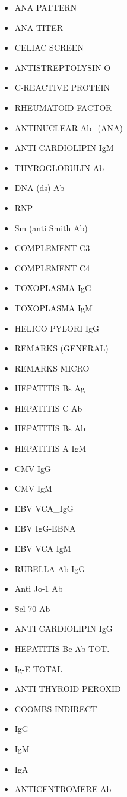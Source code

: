 \documentclass[a4paper,12pt]{article}
\begin{document}
\begin{appendices}
\begin{itemize}
   			\item ANA PATTERN
   			\item ANA TITER
   			\item CELIAC SCREEN
   			\item ANTISTREPTOLYSIN O
   			\item C-REACTIVE PROTEIN
   			\item RHEUMATOID FACTOR
   			\item ANTINUCLEAR Ab\_(ANA)
   			\item ANTI CARDIOLIPIN IgM
   			\item THYROGLOBULIN Ab
   			\item DNA (ds) Ab
   			\item RNP
   			\item Sm (anti Smith Ab)
   			\item COMPLEMENT C3
   			\item COMPLEMENT C4
   			\item TOXOPLASMA IgG
   			\item TOXOPLASMA IgM
   			\item HELICO PYLORI IgG
   			\item REMARKS (GENERAL)
   			\item REMARKS MICRO
   			\item HEPATITIS Bs Ag
   			\item HEPATITIS C Ab
   			\item HEPATITIS Bs Ab
   			\item HEPATITIS A IgM
   			\item CMV IgG
   			\item CMV IgM
   			\item EBV VCA\_IgG
   			\item EBV IgG-EBNA
   			\item EBV VCA IgM
   			\item RUBELLA Ab IgG
   			\item Anti Jo-1 Ab
   			\item Scl-70 Ab
   			\item ANTI CARDIOLIPIN IgG
   			\item HEPATITIS Bc Ab TOT.
   			\item Ig-E TOTAL
   			\item ANTI THYROID PEROXID
   			\item COOMBS INDIRECT
   			\item IgG
   			\item IgM
   			\item IgA
   			\item ANTICENTROMERE Ab

\end{itemize}
\end{appendices}
\end{document}
